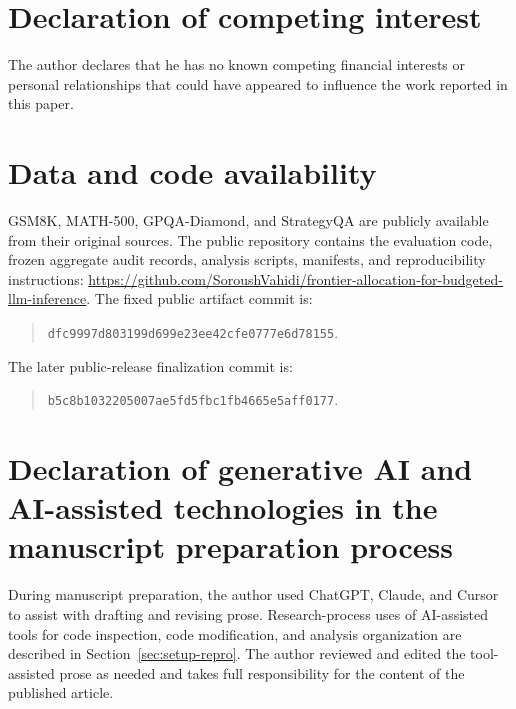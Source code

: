 \documentclass[preprint,12pt]{elsarticle}
\begin{document}
\section*{Declaration of competing interest}
The author declares that he has no known competing financial interests or personal relationships
that could have appeared to influence the work reported in this paper.

\section*{Data and code availability}
GSM8K, MATH-500, GPQA-Diamond, and StrategyQA are publicly available from their original sources.
The public repository contains the evaluation code, frozen aggregate audit records, analysis scripts,
manifests, and reproducibility instructions:
\href{https://github.com/SoroushVahidi/frontier-allocation-for-budgeted-llm-inference}{\url{https://github.com/SoroushVahidi/frontier-allocation-for-budgeted-llm-inference}}.
The fixed public artifact commit is:
\begin{quote}
\texttt{dfc9997d803199d699e23ee42cfe0777e6d78155}.
\end{quote}
The later public-release finalization commit is:
\begin{quote}
\texttt{b5c8b1032205007ae5fd5fbc1fb4665e5aff0177}.
\end{quote}

\section*{Declaration of generative AI and AI-assisted technologies in the manuscript preparation process}
During manuscript preparation, the author used ChatGPT, Claude, and Cursor to assist with drafting
and revising prose. Research-process uses of AI-assisted tools for code inspection, code
modification, and analysis organization are described in Section~\ref{sec:setup-repro}. The author
reviewed and edited the tool-assisted prose as needed and takes full responsibility for the content
of the published article.




\newpage
\appendix

\end{document}
